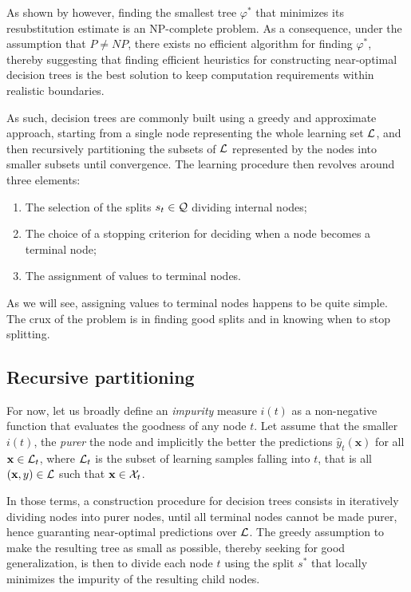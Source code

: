 As shown by \citet{hyafil:1976} however, finding the smallest tree $\varphi^*$
that minimizes its resubstitution estimate is an NP-complete problem. As a
consequence, under the assumption that $P \neq NP$, there exists no efficient
algorithm for finding $\varphi^*$, thereby suggesting that finding efficient heuristics
for constructing near-optimal decision trees is the best solution to keep computation
requirements within realistic boundaries.

As such, decision trees are commonly built using a greedy and approximate
approach, starting from a single node representing the whole learning set
${\cal L}$, and then recursively partitioning the subsets of ${\cal L}$
represented by the nodes into smaller subsets until convergence.  The learning
procedure then revolves around three elements:

\begin{enumerate}
\item The selection of the splits $s_t \in {\cal Q}$ dividing internal nodes;
\item The choice of a stopping criterion for deciding when a node becomes a terminal node;
\item The assignment of values to terminal nodes.
\end{enumerate}

As we will see, assigning values to terminal nodes happens to be quite simple.
The crux of the problem is in finding good splits and in knowing when to
stop splitting.

\subsection{Recursive partitioning}

For now, let us broadly define an \textit{impurity} measure $i(t)$ as a
non-negative function that evaluates the goodness of any node $t$. Let assume that
the smaller $i(t)$, the \textit{purer} the node and implicitly the better the predictions
$\widehat{y}_t(\mathbf{x})$ for all $\mathbf{x} \in {\cal L}_t$, where ${\cal
L}_t$ is the subset of learning samples falling into $t$, that is all
$(\mathbf{x}, y) \in {\cal L}$ such that $\mathbf{x} \in {\cal X}_t$.

In those terms, a construction procedure for decision trees consists in
iteratively dividing nodes into purer nodes, until all terminal nodes
cannot be made purer, hence guaranting near-optimal predictions over ${\cal
L}$. The greedy assumption to make the resulting tree as small as possible,
thereby seeking for good generalization, is then to divide each node $t$ using
the split $s^*$ that locally minimizes the impurity of the resulting child
nodes.

